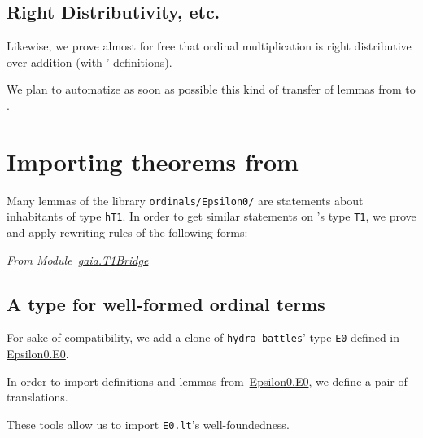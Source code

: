 
 \subsection{Right Distributivity, etc.}
 Likewise, we prove almost for free that ordinal multiplication is right distributive over addition (with \HydrasLib' definitions).


We plan to automatize as soon as possible this kind of transfer of lemmas from \gaia to \HydrasLib.


\section{Importing theorems from \HydrasLib}


Many lemmas of the library \texttt{ordinals/Epsilon0/} are statements about inhabitants of type \texttt{hT1}. In order to get
similar statements on \gaia's type \texttt{T1}, we prove and
apply rewriting rules of the following forms:

\vspace{4pt}

\noindent\emph{From Module~\href{../theories/html/gaia.T1Bridge.html}{gaia.T1Bridge}}





\subsection{A type for well-formed ordinal terms}

For sake of compatibility, we add a clone of \texttt{hydra-battles}' type \texttt{E0} defined in \href{../theories/html/hydras.Epsilon0.E0.html}{Epsilon0.E0}.


In order to import definitions and lemmas
from~\href{../theories/html/hydras.Epsilon0.E0.html}{Epsilon0.E0}, we define a pair of translations.


These tools allow us to import \texttt{E0.lt}'s  well-foundedness.

